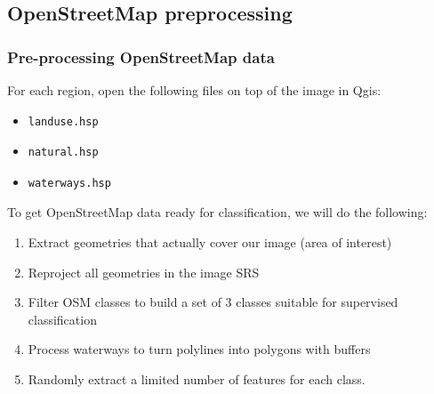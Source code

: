 \documentclass[8pt]{beamer}
\begin{document}
\subsection{OpenStreetMap preprocessing}
\begin{frame}[fragile]
\frametitle{Pre-processing OpenStreetMap data}

For each region, open the following files on top of the image in Qgis:
\begin{itemize}
\item \begin{verbatim}landuse.hsp\end{verbatim}
\item \begin{verbatim}natural.hsp\end{verbatim}
\item \begin{verbatim}waterways.hsp\end{verbatim}
\end{itemize}

To get OpenStreetMap data ready for classification, we will do the following:
\begin{enumerate}
\item Extract geometries that actually cover our image (area of interest)
\item Reproject all geometries in the image SRS
\item Filter OSM classes to build a set of 3 classes suitable for supervised classification
\item Process waterways to turn polylines into polygons with buffers
\item Randomly extract a limited number of features for each class.
\end{enumerate}
\end{frame}
\end{document}
